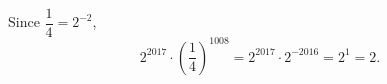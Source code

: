 Since $\dfrac{1}{4}=2^{-2}$,
\[
2^{2017}\cdot\left(\dfrac{1}{4}\right)^{1008}=2^{2017}\cdot2^{-2016}=2^{1}=\boxed{2}.
\]
